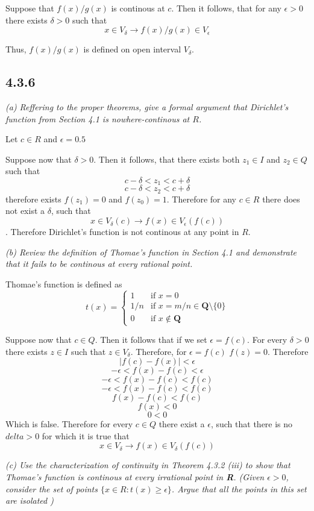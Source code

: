 \documentclass[11pt,oneside,titlepage]{book}
\begin{document}
Suppose that $f(x) / g(x)$ is continous at $c$. Then it follows, that for any
$\epsilon > 0$ there exists $\delta > 0$ such that
$$ x \in V_\delta \to f(x)/g(x) \in V_\epsilon$$

Thus, $f(x)/g(x)$ is defined on open interval $V_\delta$.

\subsection*{4.3.6}
\textit{(a) Reffering to the proper theorems, give a formal argument that
  Dirichlet's function from Section 4.1 is nowhere-continous at $R$.}

Let $c \in R$ and $\epsilon = 0.5$

Suppose now that $\delta > 0$. Then it follows, that there exists both
$z_1 \in I$ and $z_2 \in Q$ such that
$$c - \delta < z_1 < c + \delta$$
$$c - \delta < z_2 < c + \delta$$
therefore exists $f(z_1) = 0$ and $f(z_0) = 1$.
Therefore for any $c \in R$ there does not exist a $\delta$, such that
$$x \in V_\delta(c) \to f(x) \in V_\epsilon(f(c))$$. Therefore Dirichlet's
function is not continous at any point in $R$.

\textit{(b) Review the definition of Thomae's function in Section 4.1 and
  demonstrate that it fails to be continous at every rational point.}

Thomae's function is defined as 
\begin{equation}
  t(x)=
  \begin{cases}
    1 & \text{if } x = 0\\
    1/n & \text {if } x = m/n \in \textbf{Q} \text{\textbackslash} \{0\} \\
    0 & \text{if } x \notin \textbf{Q}
  \end{cases}
\end{equation}

Suppose now that $c \in Q$. Then it follows that if we set $\epsilon = f(c)$.
For every $\delta > 0$ there exists $z \in I$ such that $z \in V_\delta$.
Therefore, for $\epsilon = f(c)$ $f(z) = 0$. Therefore
$$|f(c) - f(x)| < \epsilon$$
$$- \epsilon < f(x) - f(c) < \epsilon$$
$$- \epsilon < f(x) - f(c) < f(c)$$
$$- \epsilon < f(x) - f(c) < f(c)$$
$$f(x) - f(c) < f(c)$$
$$f(x) < 0$$
$$0  < 0$$
Which is false. Therefore for every $c \in Q$ there exist a $\epsilon$,
such that there is no $delta > 0$ for which it is true that
$$x \in V_\delta \to f(x) \in V_\delta(f(c))$$

\textit{(c) Use the characterization of continuity in Theorem 4.3.2 (iii) to
  show that Thomae's function is continous at every irrational point in
  \textbf{R}. (Given $\epsilon > 0$, consider the set of points
  $\{x \in R: t(x) \geq \epsilon\}$. Argue that all the points in this set
  are isolated )}
\end{document}

